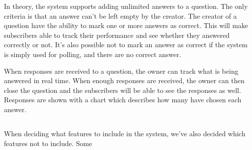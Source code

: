 In theory, the system supports adding unlimited answers to a question. The only criteria is that an answer can't be left empty by the creator. The creator of a question have the ability to mark one or more answers as correct. This will make subscribers able to track their performance and see whether they answered correctly or not. It's also possible not to mark an answer as correct if the system is simply used for polling, and there are no correct answer.

When responses are received to a question, the owner can track what is being answered in real time. When enough responses are received, the owner can then close the question and the subscribers will be able to see the responses as well. Responses are shown with a chart which describes how many have chosen each answer. 


\subsection{}
When deciding what features to include in the system, we've also decided which features not to include. Some 


